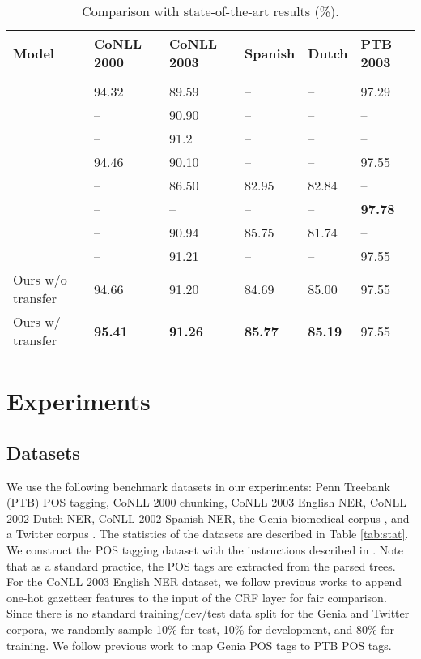 \documentclass{article} \usepackage{iclr2017_conference,times}
\begin{document}
\begin{table*}[t]
\caption{\small Comparison with state-of-the-art results (\%).}
\label{tab:sota}
\begin{center}
\begin{tabular}{llllll}
Model & CoNLL 2000 & CoNLL 2003 & Spanish & Dutch & PTB 2003
\\ \hline \\
\cite{collobert2011natural} & 94.32 & 89.59 & -- & -- & 97.29 \\
\cite{passos2014lexicon} & -- & 90.90 & -- & -- & -- \\
\cite{luo2015joint} & -- & 91.2 & -- & -- & -- \\
\cite{huang2015bidirectional} & 94.46 & 90.10 & -- & -- & 97.55 \\
\cite{gillick2015multilingual} & -- & 86.50 & 82.95 & 82.84 & -- \\
\cite{ling2015finding} & -- & -- & -- & -- & \textbf{97.78} \\
\cite{lample2016neural} & -- & 90.94 & 85.75 & 81.74 & -- \\
\cite{ma2016end} & -- & 91.21 & -- & -- & 97.55 \\
\hline
Ours w/o transfer & 94.66 & 91.20 & 84.69 & 85.00 & 97.55 \\
Ours w/ transfer & \textbf{95.41} & \textbf{91.26} & \textbf{85.77} & \textbf{85.19} & 97.55 \\
\end{tabular}
\end{center}
\vspace{-0.1in}
\end{table*}

\section{Experiments}

\subsection{Datasets}

We use the following benchmark datasets in our experiments: Penn Treebank (PTB) POS tagging, CoNLL 2000 chunking, CoNLL 2003 English NER, CoNLL 2002 Dutch NER, CoNLL 2002 Spanish NER, the Genia biomedical corpus \citep{kim2003genia}, and a Twitter corpus \citep{ritter2011named}. The statistics of the datasets are described in Table \ref{tab:stat}.
We construct the POS tagging dataset with the instructions described in \cite{toutanova2003feature}. Note that as a standard practice, the POS tags are extracted from the parsed trees. For the CoNLL 2003 English NER dataset, we follow previous works \citep{collobert2011natural} to append one-hot gazetteer features to the input of the CRF layer for fair comparison. 
Since there is no standard training/dev/test data split for the Genia and Twitter corpora, we randomly sample 10\% for test, 10\% for development, and 80\% for training. We follow previous work \citep{barrett2014token} to map Genia POS tags to PTB POS tags.
\end{document}
